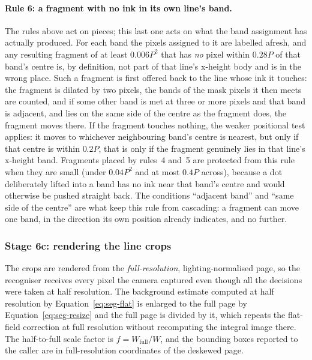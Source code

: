 \paragraph{Rule 6: a fragment with no ink in its own line's band.}
The rules above act on pieces; this last one acts on what the band assignment has actually produced.
For each band the pixels assigned to it are labelled afresh, and any resulting fragment of at least $0.006P^2$ that has \emph{no} pixel within $0.28P$ of that band's centre is, by definition, not part of that line's x-height body and is in the wrong place.
Such a fragment is first offered back to the line whose ink it touches: the fragment is dilated by two pixels, the bands of the mask pixels it then meets are counted, and if some other band is met at three or more pixels and that band is adjacent, and lies on the same side of the centre as the fragment does, the fragment moves there.
If the fragment touches nothing, the weaker positional test applies: it moves to whichever neighbouring band's centre is nearest, but only if that centre is within $0.2P$, that is only if the fragment genuinely lies in that line's x-height band.
Fragments placed by rules~4 and~5 are protected from this rule when they are small (under $0.04P^2$ and at most $0.4P$ across), because a dot deliberately lifted into a band has no ink near that band's centre and would otherwise be pushed straight back.
The conditions ``adjacent band'' and ``same side of the centre'' are what keep this rule from cascading: a fragment can move one band, in the direction its own position already indicates, and no further.

\subsubsection{Stage 6c: rendering the line crops}

The crops are rendered from the \emph{full-resolution}, lighting-normalised page, so the recogniser receives every pixel the camera captured even though all the decisions were taken at half resolution.
The background estimate computed at half resolution by Equation~\ref{eq:seg-flat} is enlarged to the full page by Equation~\ref{eq:seg-resize} and the full page is divided by it, which repeats the flat-field correction at full resolution without recomputing the integral image there.
The half-to-full scale factor is $f=W_{\mathrm{full}}/W$, and the bounding boxes reported to the caller are in full-resolution coordinates of the deskewed page.

